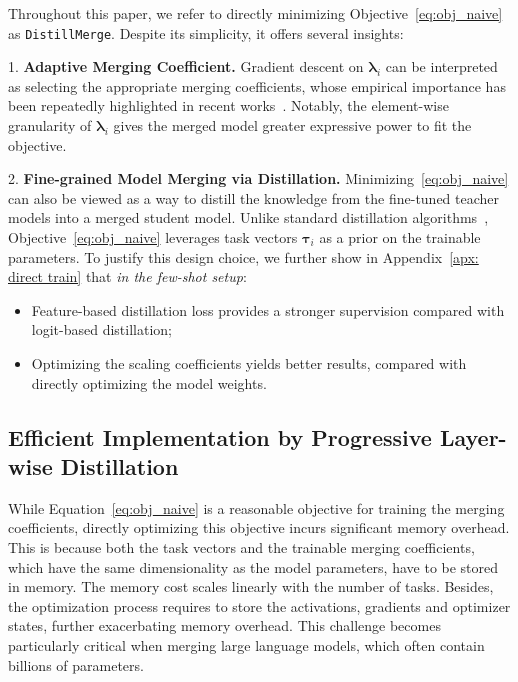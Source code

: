 Throughout this paper, we refer to directly minimizing Objective~\ref{eq:obj_naive} as \texttt{DistillMerge}. Despite its simplicity, it offers several insights:

1. \textbf{Adaptive Merging Coefficient.} Gradient descent on $\boldsymbol{\lambda}_i$ can be interpreted as selecting the appropriate merging coefficients, whose empirical importance has been repeatedly highlighted in recent works~\citep{jin2022dataless, yang2023adamerging,gauthier2024merging}. Notably, the element-wise granularity of $\boldsymbol{\lambda}_i$ gives the merged model greater expressive power to fit the objective. 

2. \textbf{Fine-grained Model Merging via Distillation.} Minimizing~\ref{eq:obj_naive} can also be viewed as a way to distill the knowledge from the fine-tuned teacher models into a merged student model.
Unlike standard distillation algorithms~\citep{hinton2015distilling}, Objective~\ref{eq:obj_naive} leverages task vectors $\boldsymbol{\tau}_i$ as a prior on the trainable parameters. 
To justify this design choice, we further show in Appendix~\ref{apx: direct train} that \textit{in the few-shot setup}:
\begin{itemize}
    \setlength{\topsep}{0em}
    \setlength{\itemsep}{0em}
    \item Feature-based distillation loss provides a stronger supervision compared with logit-based distillation;
    \item Optimizing the scaling coefficients yields better results, compared with directly optimizing the model weights. 
\end{itemize}

\subsection{Efficient Implementation by Progressive Layer-wise Distillation}
While Equation~\ref{eq:obj_naive} is a reasonable objective for  training the merging coefficients, 
directly optimizing this objective incurs significant memory overhead. This is because both the task vectors and the trainable merging coefficients, which have the same dimensionality as the model parameters, have to be stored in memory. The memory cost scales linearly with the number of tasks. Besides, the optimization process requires to store the activations, gradients and optimizer states, further exacerbating memory overhead. This challenge becomes particularly critical when merging large language models, which often contain billions of parameters.

